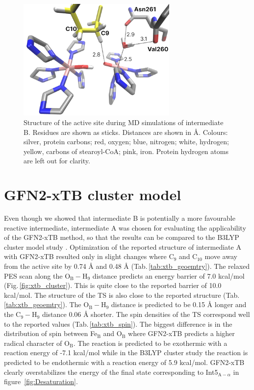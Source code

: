 \begin{figure}[!htb]
    \centering
    \includegraphics[width=0.7\textwidth]{Figures/int_B_run1.png}
    \caption{Structure of the active site during MD simulations of intermediate B. Residues are shown as sticks. Distances are shown in Å. Colours: silver, protein carbons; red, oxygen; blue, nitrogen; white, hydrogen; yellow, carbons of stearoyl-CoA; pink, iron. Protein hydrogen atoms are left out for clarity.}
    \label{fig:intB_run1}
\end{figure}

\section{GFN2-xTB cluster model}
Even though we showed that intermediate B is potentially a more favourable reactive intermediate, intermediate A was chosen for evaluating the applicability of the GFN2-xTB method, so that the results can be compared to the B3LYP cluster model study \cite{Yu2019}. Optimization of the reported structure of intermediate A with GFN2-xTB resulted only in slight changes where C$_9$ and C$_{10}$ move away from the active site by 0.74 Å and 0.48 Å (Tab.\,\ref{tab:xtb_geoemtry}). The relaxed PES scan along the O$_{\text{B}}-$H$_9$ distance predicts an energy barrier of 7.0 kcal/mol (Fig.\,\ref{fig:xtb_cluster}). This is quite close to the reported barrier of 10.0 kcal/mol. The structure of the TS is also close to the reported structure (Tab.\,\ref{tab:xtb_geoemtry}). The O$_{\text{B}}-$H$_9$ distance is predicted to be 0.15 Å longer and the C$_{\text{9}}-$H$_{\text{9}}$ distance 0.06 Å shorter. The spin densities of the TS correspond well to the reported values (Tab.\,\ref{tab:xtb_spin}). The biggest difference is in the distribution of spin between Fe$_{\text{B}}$ and O$_{\text{B}}$ where GFN2-xTB predicts a higher radical character of O$_{\text{B}}$. The reaction is predicted to be exothermic with a reaction energy of -7.1 kcal/mol while in the B3LYP cluster study the reaction is predicted to be endothermic with a reaction energy of 5.9 kcal/mol. GFN2-xTB clearly overstabilizes the energy of the final state corresponding to Int5$_{\text{A}-\alpha}$ in figure~\ref{fig:Desaturation}.

